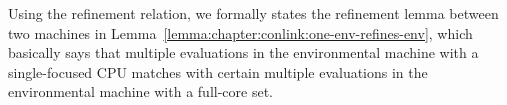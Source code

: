 


%
%


Using the refinement relation, 
we formally states the refinement lemma between two machines in Lemma~\ref{lemma:chapter:conlink:one-env-refines-env},
which basically says that 
multiple evaluations in the environmental machine with a single-focused CPU matches with certain multiple evaluations in the environmental machine with a full-core set.

